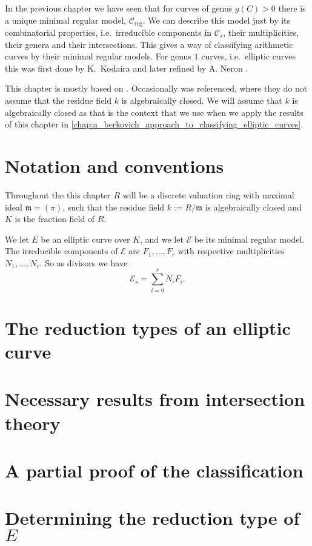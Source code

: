 In the previous chapter we have seen that for curves of genus $g(C) > 0$ there is a unique minimal regular model, $\mathscr C_\text{reg} $.
We can describe this model just by its combinatorial properties, i.e.\ irreducible components in $\mathscr C_s$, their multiplicities, their genera and their intersections.
This gives a way of classifying arithmetic curves by their minimal regular models. 
For genus $1$ curves, i.e.\ elliptic curves this was first done by K.\ Kodaira \cite{kodairaCompactAnalyticSurfaces1963} and later refined by A. Neron \cite{neronModelesMinimauxVarietes1964}.

This chapter is mostly based on \cite[][\S 8]{silvermanAdvancedTopicsArithmetic1994}. Occasionally \cite[sec.\ 10.2]{liuAlgebraicGeometryArithmetic2002} was referenced, where they do not assume that the residue field $k$ is algebraically closed. 
We will assume that $k$ is algebraically closed as that is the context that we use when we apply the results of this chapter in \cref{chap:a_berkovich_approach_to_classifying_elliptic_curves}.

\section{Notation and conventions} \label{sec:notation_and_conventions}

Throughout the this chapter $R$ will be a discrete valuation ring with maximal ideal $\mathfrak{m} = (\pi) $, such that the residue field $k := R / \mathfrak{m} $ is algebraically closed and $K$ is the fraction field of $R$. 

We let $E$ be an elliptic curve over $K$, and we let $\mathscr E$ be its minimal regular model. 
The irreducible components of $\mathscr E$ are $F_1, \ldots, F_r$ with respective multiplicities $N_1, \ldots, N_r$. 
So as divisors we have  
\begin{equation}\label{eq:decomposition_fibre}
	\mathscr E_s = \sum_{i = 0}^{r} N_i F_i.
\end{equation}

\section{The reduction types of an elliptic curve} \label{sec:the_reduction_types_of_an_elliptic_curve}


\section{Necessary results from intersection theory} \label{sec:necessary_results_from_intersection_theory}



\section{A partial proof of the classification} \label{sec:a_partial_proof_of_the_classification}


\section{Determining the reduction type of $E$} \label{sec:determining_the_reduction_type_of_e}






